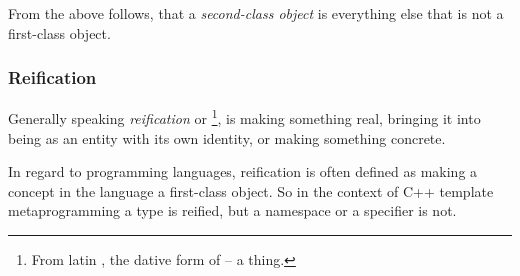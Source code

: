 From the above follows, that a {\em second-class object} is everything else that
is not a first-class object.

\subsubsection{Reification}
\label{term-reification}

Generally speaking {\em reification} or \footnote{From latin , the dative form of  -- a thing.}, is making something
real, bringing it into being as an entity with its own identity,
or making something concrete.

In regard to programming languages, reification is often defined as making
a concept in the language a first-class object. So in the context of C++ template
metaprogramming a type is reified, but a namespace or a specifier is not.

